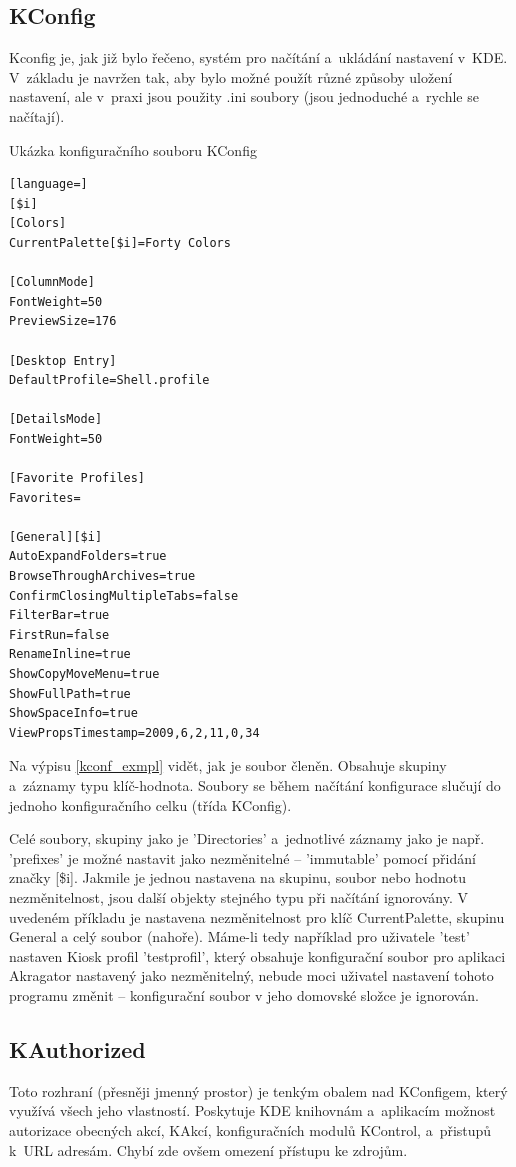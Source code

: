 \subsection{KConfig}
Kconfig je, jak již bylo řečeno, systém pro načítání a~ukládání nastavení v~KDE. V~základu je navržen tak, aby bylo možné použít různé způsoby uložení nastavení, ale v~praxi jsou použity .ini soubory (jsou jednoduché a~rychle se načítají).
\begin{mylisting}
\caption{Ukázka konfiguračního souboru KConfig}
\label{kconf_exmpl}
\begin{lstlisting}[language=]
[$i]
[Colors]
CurrentPalette[$i]=Forty Colors

[ColumnMode]
FontWeight=50
PreviewSize=176

[Desktop Entry]
DefaultProfile=Shell.profile

[DetailsMode]
FontWeight=50

[Favorite Profiles]
Favorites=

[General][$i]
AutoExpandFolders=true
BrowseThroughArchives=true
ConfirmClosingMultipleTabs=false
FilterBar=true
FirstRun=false
RenameInline=true
ShowCopyMoveMenu=true
ShowFullPath=true
ShowSpaceInfo=true
ViewPropsTimestamp=2009,6,2,11,0,34
\end{lstlisting}
\end{mylisting}

Na výpisu \ref{kconf_exmpl} vidět, jak je soubor členěn. Obsahuje skupiny a~záznamy typu klíč-hodnota. Soubory se během načítání konfigurace slučují do jednoho konfiguračního celku (třída KConfig).

Celé soubory, skupiny jako je 'Directories' a~jednotlivé záznamy jako je např. 'prefixes' je možné nastavit jako nezměnitelné -- 'immutable' pomocí přidání značky [\$i]. Jakmile je jednou nastavena na skupinu, soubor nebo hodnotu nezměnitelnost, jsou další objekty stejného typu při načítání ignorovány. V uvedeném příkladu je nastavena nezměnitelnost pro klíč CurrentPalette, skupinu General a celý soubor (nahoře). Máme-li tedy například pro uživatele 'test' nastaven Kiosk profil 'testprofil', který obsahuje konfigurační soubor pro aplikaci Akragator nastavený jako nezměnitelný, nebude moci uživatel nastavení tohoto programu změnit -- konfigurační soubor v jeho domovské složce je ignorován.

\subsection{KAuthorized}
Toto rozhraní (přesněji jmenný prostor) je tenkým obalem nad KConfigem, který využívá všech jeho vlastností. Poskytuje KDE knihovnám a~aplikacím možnost autorizace obecných akcí, KAkcí, konfiguračních modulů KControl, a~přistupů k~URL adresám. Chybí zde ovšem omezení přístupu ke zdrojům.

